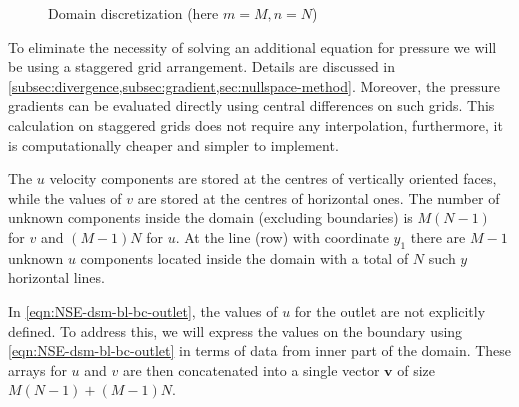 \documentclass{article}
\numberwithin{equation}{section}
\begin{document}
\begin{figure}[H] %
  \caption{Domain discretization (here $m=M, n=N$)}\label{bl-domain-discretization}
\end{figure}

To eliminate the necessity of solving an additional equation for pressure we will be using a staggered grid arrangement. 
	Details are discussed in \cref{subsec:divergence,subsec:gradient,sec:nullspace-method}. 
	Moreover, the pressure gradients can be evaluated directly using central differences on such grids. 
	This calculation on staggered grids does not require any interpolation, furthermore, it is computationally cheaper and simpler to implement. 

The $u$ velocity components are stored at the centres of vertically oriented faces, while the values of $v$ are stored at the centres of horizontal ones. 
	The number of unknown components inside the domain (excluding boundaries) is $M(N-1)$ for $v$ and $(M-1)N$ for $u$. 
	At the line (row) with coordinate $y_1$ there are $M-1$ unknown $u$ components located inside the domain with a total of $N$ such $y$ horizontal lines. 

In \cref{eqn:NSE-dsm-bl-bc-outlet}, the values of $u$ for the outlet are not explicitly defined. 
	To address this, we will express the values on the boundary using \cref{eqn:NSE-dsm-bl-bc-outlet} in terms of data from inner part of the domain. 
	These arrays for $u$ and $v$ are then concatenated into a single vector $\boldsymbol{v}$ of size $M(N-1)+(M-1)N$.
\end{document}
